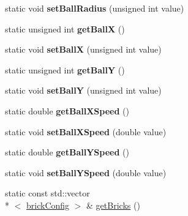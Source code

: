 \begin{DoxyCompactItemize}
\item 
\hypertarget{class_config_reader_a671459d784b81860a4d0347ceb505e26}{static void {\bfseries set\+Ball\+Radius} (unsigned int value)}\label{class_config_reader_a671459d784b81860a4d0347ceb505e26}

\item 
\hypertarget{class_config_reader_a32f2b819127f5112c55346cdba8aaf5d}{static unsigned int {\bfseries get\+Ball\+X} ()}\label{class_config_reader_a32f2b819127f5112c55346cdba8aaf5d}

\item 
\hypertarget{class_config_reader_ac9d004ecd03d034a5f9dbdb4f6b0a8ef}{static void {\bfseries set\+Ball\+X} (unsigned int value)}\label{class_config_reader_ac9d004ecd03d034a5f9dbdb4f6b0a8ef}

\item 
\hypertarget{class_config_reader_a0132978e7628471ac499d238c6afc536}{static unsigned int {\bfseries get\+Ball\+Y} ()}\label{class_config_reader_a0132978e7628471ac499d238c6afc536}

\item 
\hypertarget{class_config_reader_a456b94e56c303c60c07141a059ad9762}{static void {\bfseries set\+Ball\+Y} (unsigned int value)}\label{class_config_reader_a456b94e56c303c60c07141a059ad9762}

\item 
\hypertarget{class_config_reader_ae389813f370910d20b7ca9813551a54b}{static double {\bfseries get\+Ball\+X\+Speed} ()}\label{class_config_reader_ae389813f370910d20b7ca9813551a54b}

\item 
\hypertarget{class_config_reader_ab25ba929a2a3a7e3d71334b169af5b9b}{static void {\bfseries set\+Ball\+X\+Speed} (double value)}\label{class_config_reader_ab25ba929a2a3a7e3d71334b169af5b9b}

\item 
\hypertarget{class_config_reader_ade24fafc7a78c34e43c3814a987abe44}{static double {\bfseries get\+Ball\+Y\+Speed} ()}\label{class_config_reader_ade24fafc7a78c34e43c3814a987abe44}

\item 
\hypertarget{class_config_reader_aad5425ff1e870aea4e17c0397c8b404f}{static void {\bfseries set\+Ball\+Y\+Speed} (double value)}\label{class_config_reader_aad5425ff1e870aea4e17c0397c8b404f}

\item 
\hypertarget{class_config_reader_ac3a104128d429cc16b840def0e2d56df}{static const std\+::vector\\*
$<$ \hyperlink{struct_config_reader_1_1brick_config}{brick\+Config} $>$ \& \hyperlink{class_config_reader_ac3a104128d429cc16b840def0e2d56df}{get\+Bricks} ()}\label{class_config_reader_ac3a104128d429cc16b840def0e2d56df}


\end{DoxyCompactItemize}
